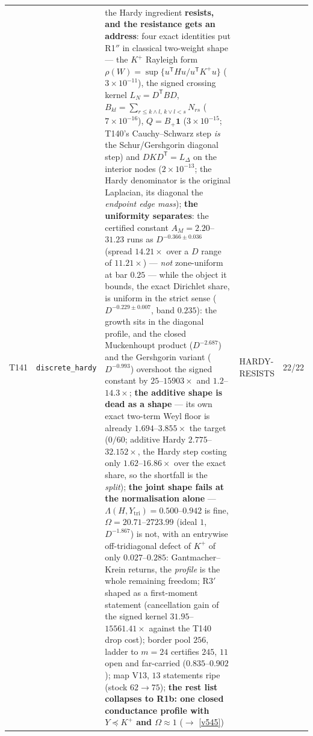 \documentclass[11pt,a4paper]{article}
\begin{document}
{\begin{xltabular}{\linewidth}{@{}p{0.95cm} >{\raggedright\arraybackslash}p{3.1cm} Y >{\raggedright\scriptsize\arraybackslash}p{3.35cm} p{1.15cm}@{}}
T141 & \texttt{\scriptsize discrete\_\allowbreak hardy} & the Hardy ingredient \textbf{resists, and the resistance gets an address}: four exact identities put R1$''$ in classical two-weight shape --- the $K^{+}$ Rayleigh form $\rho(W)=\sup\{u^{\mathsf T}Hu/u^{\mathsf T}K^{+}u\}$ ($3\times10^{-11}$), the signed crossing kernel $L_N=D^{\mathsf T}BD$, $B_{kl}=\sum_{r\le k\wedge l,\,k\vee l<s}N_{rs}$ ($7\times10^{-16}$), $Q=B_+\mathbf 1$ ($3\times10^{-15}$; T140's Cauchy--Schwarz step \emph{is} the Schur/Gershgorin diagonal step) and $DKD^{\mathsf T}=L_\Delta$ on the interior nodes ($2\times10^{-13}$; the Hardy denominator is the original Laplacian, its diagonal the \emph{endpoint edge mass}); \textbf{the uniformity separates}: the certified constant $A_M=2.20$--$31.23$ runs as $D^{-0.366\pm0.036}$ (spread $14.21\times$ over a $D$ range of $11.21\times$) --- \emph{not} zone-uniform at bar $0.25$ --- while the object it bounds, the exact Dirichlet share, is uniform in the strict sense ($D^{-0.229\pm0.007}$, band $0.235$): the growth sits in the diagonal profile, and the closed Muckenhoupt product ($D^{-2.687}$) and the Gershgorin variant ($D^{-0.993}$) overshoot the signed constant by $25$--$15903\times$ and $1.2$--$14.3\times$; \textbf{the additive shape is dead as a shape} --- its own exact two-term Weyl floor is already $1.694$--$3.855\times$ the target ($0/60$; additive Hardy $2.775$--$32.152\times$, the Hardy step costing only $1.62$--$16.86\times$ over the exact share, so the shortfall is the \emph{split}); \textbf{the joint shape fails at the normalisation alone} --- $\Lambda(H,Y_{\mathrm{tri}})=0.500$--$0.942$ is fine, $\Omega=20.71$--$2723.99$ (ideal $1$, $D^{-1.867}$) is not, with an entrywise off-tridiagonal defect of $K^{+}$ of only $0.027$--$0.285$: Gantmacher--Krein returns, the \emph{profile} is the whole remaining freedom; R3$'$ shaped as a first-moment statement (cancellation gain of the signed kernel $31.95$--$15561.41\times$ against the T140 drop cost); border pool $256$, ladder to $m=24$ certifies $245$, $11$ open and far-carried ($0.835$--$0.902$); map V13, $13$ statements ripe (stock $62\to75$); \textbf{the rest list collapses to R1b: one closed conductance profile with $Y\preceq K^{+}$ and $\Omega\approx1$} ($\to$ \vref{v545}) & HARDY-RESISTS & 22/22\\

\end{xltabular}}
\end{document}
